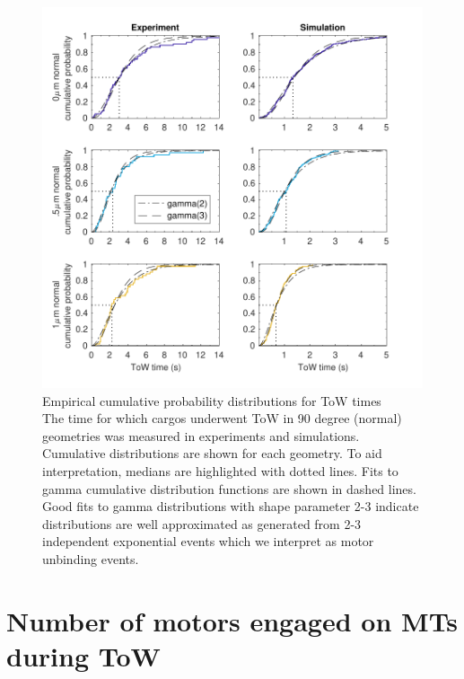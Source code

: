 \begin{figure}
\centering
\includegraphics[width=6in]{appendix2/ToWtime_fits.pdf}
\caption[Empirical cumulative probability distributions for ToW times]{Empirical cumulative probability distributions for ToW times \\
The time for which cargos underwent ToW in 90 degree (normal) geometries was measured in experiments and simulations. Cumulative distributions are shown for each geometry. To aid interpretation, medians are highlighted with dotted lines. Fits to gamma cumulative distribution functions are shown in dashed lines. Good fits to gamma distributions with shape parameter 2-3 indicate distributions are well approximated as generated from 2-3 independent exponential events which we interpret as motor unbinding events.
} \label{fig:ToWtimes}
\end{figure}

\clearpage

\chapter{Number of motors engaged on MTs during ToW}

